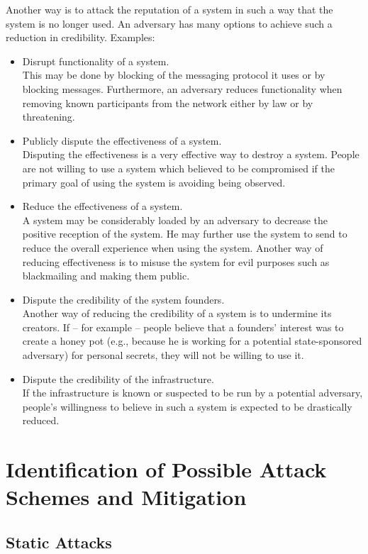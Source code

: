 Another way is to attack the reputation of a system in such a way that the system is no longer used. An adversary has many options to achieve such a reduction in credibility. Examples:
\begin{itemize}
	\item Disrupt functionality of a system.\\ 
	This may be done by blocking of the messaging protocol it uses or by blocking messages. Furthermore, an adversary reduces functionality when removing known participants from the network either by law or by threatening.
	\item Publicly dispute the effectiveness of a system.\\
	Disputing the effectiveness is a very effective way to destroy a system. People are not willing to use a system which believed to be compromised if the primary goal of using the system is avoiding being observed.
	\item Reduce the effectiveness of a system.\\
	A system may be considerably loaded by an adversary to decrease the positive reception of the system. He may further use the system to send  to reduce the overall experience when using the system. Another way of reducing effectiveness is to misuse the system for evil purposes such as blackmailing and making them public.
	\item Dispute the credibility of the system founders.\\
	Another way of reducing the credibility of a system is to undermine its creators. If -- for example -- people believe that a founders' interest was to create a honey pot (e.g., because he is working for a potential state-sponsored adversary) for personal secrets, they will not be willing to use it.
	\item Dispute the credibility of the infrastructure.\\
	If the infrastructure is known or suspected to be run by a potential adversary, people's willingness to believe in such a system is expected to be drastically reduced.
\end{itemize}


\chapter{Identification of Possible Attack Schemes and Mitigation\label{sec:attacks}}
\section{Static Attacks}
